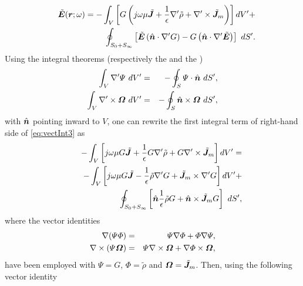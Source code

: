 \begin{eqnarray}
\label{eq:vectInt3}
& &\tilde{\mbfit{E}}(\mbfit{r}; \omega) = - \int_V \left [ G \left ( j\omega\mu\tilde{\mbfit{J}} + \frac{1}{\epsilon} {\nabla}' \tilde{\rho} + {\nabla}' \times \tilde{\mbfit{J}}_m \right ) \right ] dV'  + \nonumber \\
& &\hspace{0.5cm} \oint_{S_0+S_{\infty}} \left [  \tilde{\mbfit{E}} \left ( \hat{\mbfit{n}} \cdot {\nabla}' G \right ) - G \left ( \hat{\mbfit{n}} \cdot {\nabla}' \tilde{\mbfit{E}} \right ) \right ] \ dS'.
\end{eqnarray} Using the integral theorems (respectively the  and the ) \cite{RothwellCloudE}
\begin{eqnarray} %
\int_V {\nabla}' \Psi \ dV' &= & - \oint_S \Psi \cdot \hat{\mbfit{n}} \ {dS'}, \\
\int_V {\nabla}' \times \mbfit{\Omega} \ dV' &= & - \oint_S \hat{\mbfit{n}} \times \mbfit{\Omega} \ {dS'},
\end{eqnarray} with $\hat{\mbfit{n}}$ pointing inward to $V$, one can rewrite the first integral term of right-hand side of \eqref{eq:vectInt3} as
\begin{eqnarray}
\label{eq:vectInt4} %
& & - \int_V \left [ j\omega\mu G \tilde{\mbfit{J}} + \frac{1}{\epsilon} G {\nabla}' \tilde{\rho} + G {\nabla}' \times \tilde{\mbfit{J}}_m \right ] dV' = \nonumber \\
& &\hspace{0.5cm} - \int_V \left [ j\omega\mu G \tilde{\mbfit{J}} - \frac{1}{\epsilon} \tilde{\rho} {\nabla}' G + \tilde{\mbfit{J}}_m \times {\nabla}' G \right ] dV' + \nonumber \\
& &\hspace{1cm} \oint_{S_0+S_{\infty}} \left [ \hat{\mbfit{n}} \frac{1}{\epsilon} \tilde{\rho} G + \hat{\mbfit{n}} \times \tilde{\mbfit{J}}_m G \right ] \ dS',
\end{eqnarray} where the vector identities \cite{OrfanidisEWA}
\begin{eqnarray}
\nabla (\Psi \Phi) &= & \Psi \nabla \Phi + \Phi \nabla \Psi, \\
\nabla \times (\Psi \mbfit{\Omega}) &= & \Psi \nabla \times \mbfit{\Omega} + \nabla \Phi \times \mbfit{\Omega},
\end{eqnarray} have been employed with $\Psi = G$, $\Phi = \tilde{\rho}$ and $\mbfit{\Omega} = \tilde{\mbfit{J}}_m$. Then, using the following vector identity \cite{OrfanidisEWA}
